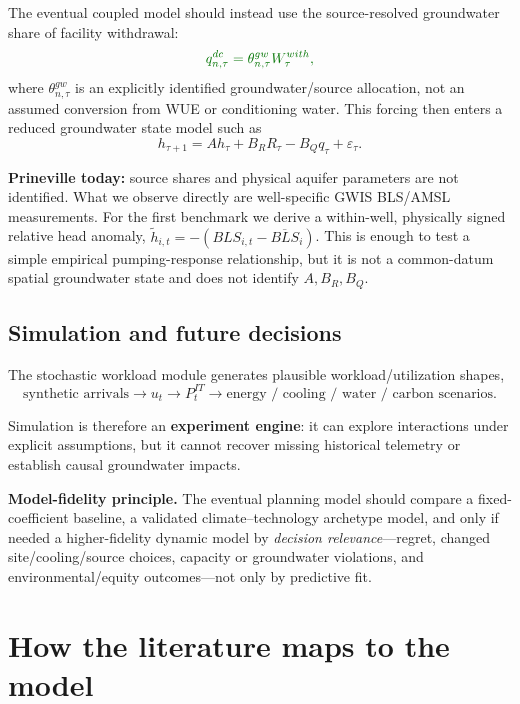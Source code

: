 \documentclass[11pt]{article}
\newcommand{\newtxt}[1]{\textcolor{green!45!black}{#1}}
\begin{document}
\newtxt{The eventual coupled model should instead use the source-resolved groundwater share of facility withdrawal:}
\[
{\color{green!45!black}
q^{dc}_{n,\tau}
=
\theta^{gw}_{n,\tau}W^{with}_{\tau},
}
\]
\newtxt{where \(\theta^{gw}_{n,\tau}\) is an explicitly identified groundwater/source allocation, not an assumed conversion from WUE or conditioning water. This forcing then enters a reduced groundwater state model such as}
\[
h_{\tau+1}
=
Ah_\tau+B_RR_\tau-B_Qq_\tau+\varepsilon_\tau.
\]

\textbf{Prineville today:} source shares and physical aquifer parameters are not identified. What we observe directly are well-specific GWIS BLS/AMSL measurements. For the first benchmark we derive a within-well, physically signed relative head anomaly, \(\tilde h_{i,t}=-(BLS_{i,t}-\overline{BLS}_i)\). This is enough to test a simple empirical pumping-response relationship, but it is not a common-datum spatial groundwater state and does not identify \(A,B_R,B_Q\).

\subsection{Simulation and future decisions}

The stochastic workload module generates plausible workload/utilization shapes,
\[
\text{synthetic arrivals}
\rightarrow
u_t
\rightarrow
P^{IT}_t
\rightarrow
\text{energy / cooling / water / carbon scenarios}.
\]

Simulation is therefore an \textbf{experiment engine}: it can explore interactions under explicit assumptions, but it cannot recover missing historical telemetry or establish causal groundwater impacts.

\newtxt{\textbf{Model-fidelity principle.} The eventual planning model should compare a fixed-coefficient baseline, a validated climate--technology archetype model, and only if needed a higher-fidelity dynamic model by \emph{decision relevance}---regret, changed site/cooling/source choices, capacity or groundwater violations, and environmental/equity outcomes---not only by predictive fit.}

\section{How the literature maps to the model}
\end{document}
